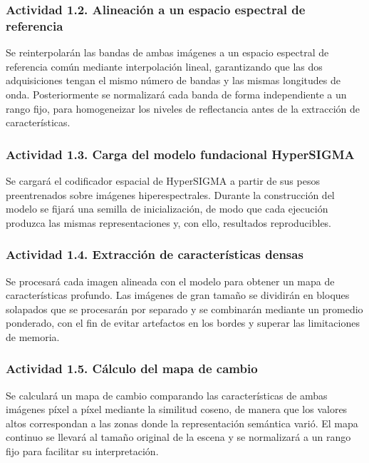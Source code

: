 \subsubsection{Actividad 1.2. Alineación a un espacio espectral de referencia}

Se reinterpolarán las bandas de ambas imágenes a un espacio espectral de referencia común mediante interpolación lineal, garantizando que las dos adquisiciones tengan el mismo número de bandas y las mismas longitudes de onda. Posteriormente se normalizará cada banda de forma independiente a un rango fijo, para homogeneizar los niveles de reflectancia antes de la extracción de características.

\subsubsection{Actividad 1.3. Carga del modelo fundacional HyperSIGMA}

Se cargará el codificador espacial de HyperSIGMA a partir de sus pesos preentrenados sobre imágenes hiperespectrales. Durante la construcción del modelo se fijará una semilla de inicialización, de modo que cada ejecución produzca las mismas representaciones y, con ello, resultados reproducibles.

\subsubsection{Actividad 1.4. Extracción de características densas}

Se procesará cada imagen alineada con el modelo para obtener un mapa de características profundo. Las imágenes de gran tamaño se dividirán en bloques solapados que se procesarán por separado y se combinarán mediante un promedio ponderado, con el fin de evitar artefactos en los bordes y superar las limitaciones de memoria.

\subsubsection{Actividad 1.5. Cálculo del mapa de cambio}

Se calculará un mapa de cambio comparando las características de ambas imágenes píxel a píxel mediante la similitud coseno, de manera que los valores altos correspondan a las zonas donde la representación semántica varió. El mapa continuo se llevará al tamaño original de la escena y se normalizará a un rango fijo para facilitar su interpretación.

